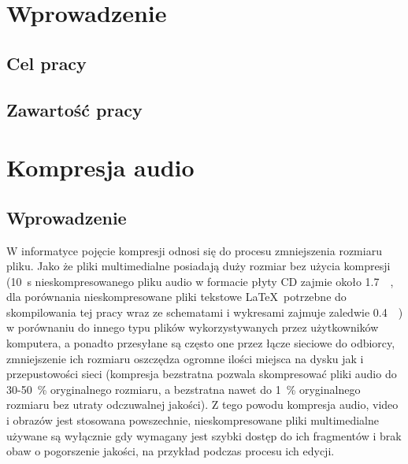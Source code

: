 \documentclass[pl,12pt]{aghdpl}
\author{Szymon Piotr Mikulicz}
\date{\today}
\let\Oldchapter\chapter%
\renewcommand{\chapter}{\FloatBarrier\Oldchapter}
\let\Oldsection\section%
\renewcommand{\section}{\FloatBarrier\Oldsection}
\begin{document}
\titlepages

{%
        \fancyhf{}
        \renewcommand{\headrulewidth}{0pt}
        \renewcommand{\footrulewidth}{0pt}
}

\setcounter{tocdepth}{2}
{\singlespacing\tableofcontents}
\clearpage

\chapter{Wprowadzenie}
\section{Cel pracy}
\section{Zawartość pracy}
\chapter{Kompresja audio}
\section{Wprowadzenie}
W informatyce pojęcie kompresji odnosi się do procesu zmniejszenia rozmiaru
pliku. Jako że pliki multimedialne posiadają duży rozmiar bez użycia kompresji
(\SI{10}{\second} nieskompresowanego pliku audio w formacie płyty CD zajmie
około \SI{1.7}{\mega\byte}, dla porównania nieskompresowane pliki tekstowe
\LaTeX\ potrzebne do skompilowania tej pracy wraz ze schematami i wykresami
zajmuje zaledwie \SI{0.4}{\mega\byte}) w porównaniu do innego typu plików
wykorzystywanych przez użytkowników komputera, a ponadto przesyłane są często
one przez łącze sieciowe do odbiorcy, zmniejszenie ich rozmiaru oszczędza
ogromne ilości miejsca na dysku jak i przepustowości sieci (kompresja
bezstratna pozwala skompresować pliki audio do \num{30}-\SI{50}{\percent}
oryginalnego rozmiaru, a bezstratna nawet do \SI{1}{\percent} oryginalnego
rozmiaru bez utraty odczuwalnej jakości). Z tego powodu kompresja audio, video
i obrazów jest stosowana powszechnie, nieskompresowane pliki multimedialne
używane są wyłącznie gdy wymagany jest szybki dostęp do ich fragmentów i brak
obaw o pogorszenie jakości, na przykład podczas procesu ich edycji.
\end{document}
